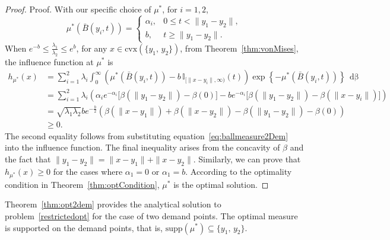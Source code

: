 \documentclass[stsy,sglanonrev]{informs4}
\newcommand{\death}{{\beta}}
\begin{document}
\begin{proof}{Proof.}
    With our specific choice of $\mu^*$, for \(i=1,2\),
    \begin{equation}\label{eq:ballmeasure2Dem}
        \mu^*\left(\bar{B}(y_i,t) \right) = 
        \begin{cases}
            \alpha_i, & 0 \leq t < \|y_1 - y_2\|, \\
            b, & t \geq \|y_1 - y_2\|.
        \end{cases}
    \end{equation}
    When \(e^{-b} \leq \frac{\lambda_1}{\lambda_2} \leq e^b\), for any \(x \in \mathrm{cvx}(\{y_1,\,y_2\})\), from Theorem~\ref{thm:vonMises}, the influence function at \(\mu^*\) is
    \begin{align*}
        h_{\mu^*}(x) &= \sum_{i=1}^2 \lambda_i \int_0^{\infty} 
        \left( \mu^*\left(\bar{B}(y_i,t) \right) - b \, \mathbb{I}_{[\|x-y_i \|,\infty)}(t) \right) 
        \exp\left\{-\mu^*\left(\bar{B}(y_i,t) \right) \right\} \, \mathop{d\death(t)} \\ 
        &= \sum_{i=1}^2 \lambda_i \left( 
        \alpha_i e^{-\alpha_i} \big[\death(\|y_1 - y_2 \|) - \death(0)\big] 
        - b e^{-\alpha_i} \big[\death(\|y_1 - y_2 \|) - \death(\|x-y_i \|)\big] 
        \right) \\  
        &= \sqrt{\lambda_1 \lambda_2} b e^{-\frac{b}{2}} \left( 
        \death(\|x-y_1 \|) + \death(\|x-y_2 \|) - \death(\|y_1-y_2 \|) - \death(0) 
        \right) \\ 
        &\geq 0.
    \end{align*}
    The second equality follows from substituting equation~\eqref{eq:ballmeasure2Dem} into the influence function. The final inequality arises from the concavity of \(\death\) and the fact that \(\|y_1 - y_2 \| = \|x - y_1 \| + \|x - y_2 \|\).
    Similarly, we can prove that \(h_{\mu^*}(x) \geq 0\) for the cases where \(\alpha_1 = 0\) or \(\alpha_1 = b\). According to the optimality condition in Theorem~\ref{thm:optCondition}, \(\mu^*\) is the optimal solution. 
    \hfill \Halmos
\end{proof}

Theorem~\ref{thm:opt2dem} provides the analytical solution to problem~\eqref{restrictedopt} for the case of two demand points. The optimal measure is supported on the demand points, that is, \(\mathrm{supp}(\mu^*) \subseteq \{y_1,\, y_2\}\). 
\end{document}
